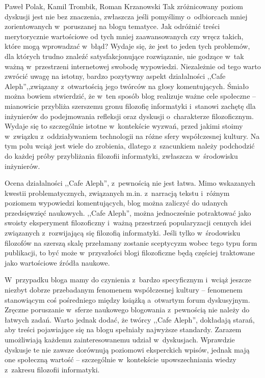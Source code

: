 \begin{newrevplenv}{Paweł Polak, Kamil Trombik, Roman Krzanowski}
Tak zróżnicowany poziom dyskusji jest nie bez znaczenia, zwłaszcza jeśli pomyślimy o~odbiorcach mniej zorientowanych w~poruszanej na blogu tematyce. Jak odróżnić treści merytorycznie wartościowe od tych mniej zaawansowanych czy wręcz takich, które mogą wprowadzać w~błąd? Wydaje się, że jest to jeden tych problemów, dla których trudno znaleźć satysfakcjonujące rozwiązanie, nie godzące w~tak ważną w~przestrzeni internetowej swobodę wypowiedzi. Niezależnie od tego warto zwrócić uwagę na istotny, bardzo pozytywny aspekt działalności ,,Cafe Aleph'',,związany z~otwartością jego twórców na głosy komentujących. Śmiało można bowiem stwierdzić, że w~ten sposób blog realizuje ważne cele społeczne -- mianowicie przybliża szerszemu gronu filozofię informatyki i~stanowi zachętę dla inżynierów do podejmowania refleksji oraz dyskusji o~charakterze filozoficznym. Wydaje się to szczególnie istotne w~kontekście wyzwań, przed jakimi stoimy w~związku z~oddziaływaniem technologii na różne sfery współczesnej kultury. Na tym polu wciąż jest wiele do zrobienia, dlatego z~szacunkiem należy podchodzić do każdej próby przybliżania filozofii informatyki, zwłaszcza w~środowisku inżynierów.

Ocena działalności ,,Cafe Aleph'', z~pewnością nie jest łatwa. Mimo wskazanych kwestii problematycznych, związanych m.in. z~narracją tekstu i~różnym poziomem wypowiedzi komentujących, blog można zaliczyć do udanych przedsięwzięć naukowych. ,,Cafe Aleph'', można jednocześnie potraktować jako swoisty eksperyment filozoficzny i~ważną przestrzeń popularyzacji cennych idei związanych z~rozwijającą się filozofią informatyki. Jeśli tylko w~środowisku filozofów na szerszą skalę przełamany zostanie sceptycyzm wobec tego typu form publikacji, to być może w~przyszłości blogi filozoficzne będą częściej traktowane jako wartościowe źródła naukowe.

W~przypadku bloga mamy do czynienia z~bardzo specyficznym i~wciąż jeszcze niezbyt dobrze przebadanym fenomenem współczesnej kultury -- fenomenem stanowiącym coś pośredniego między książką a~otwartym forum dyskusyjnym. Zręczne poruszanie w~sferze naukowego blogowania z~pewnością nie należy do łatwych zadań. Warto jednak dodać, że twórcy ,,Cafe Aleph'', dokładają starań, aby treści pojawiające się na blogu spełniały najwyższe standardy. Zarazem umożliwiają każdemu zainteresowanemu udział w~dyskusjach. Wprawdzie dyskusje te nie zawsze dorównują poziomowi eksperckich wpisów, jednak mają one społeczną wartość -- szczególnie w~kontekście upowszechniania wiedzy z~zakresu filozofii informatyki.


\end{newrevplenv}
